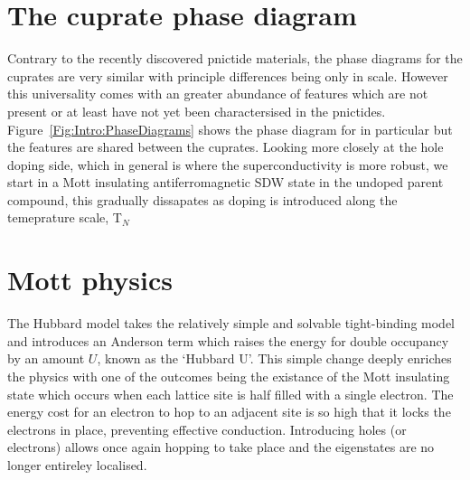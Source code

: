 
\section{The cuprate phase diagram}

Contrary to the recently discovered pnictide materials, the phase diagrams for the cuprates are very similar with principle differences being only in scale. However this universality comes with an greater abundance of features which are not present or at least have not yet been charactersised in the pnictides. Figure~\ref{Fig:Intro:PhaseDiagrams} shows the phase diagram for  in particular but the features are shared between the cuprates. Looking more closely at the hole doping side, which in general is where the superconductivity is more robust, we start in a Mott insulating antiferromagnetic \ac{SDW} state in the undoped parent compound, this gradually dissapates as doping is introduced along the temeprature scale, T$_N$



\section{Mott physics}

The Hubbard model takes the relatively simple and solvable tight-binding model and introduces an Anderson term which raises the energy for double occupancy by an amount $U$, known as the `Hubbard U'. This simple change deeply enriches the physics with one of the outcomes being the existance of the Mott insulating state which occurs when each lattice site is half filled with a single electron. The energy cost for an electron to hop to an adjacent site is so high that it locks the electrons in place, preventing effective conduction. Introducing holes (or electrons) allows once again hopping to take place and the eigenstates are no longer entireley localised.

